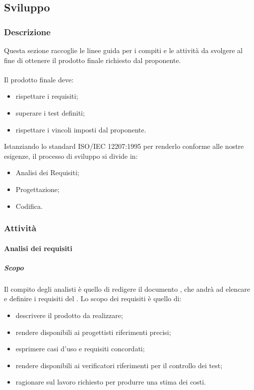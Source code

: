 \subsection{Sviluppo}

	\subsubsection{Descrizione}
	Questa sezione raccoglie le linee guida per i compiti e le attività da svolgere al fine di ottenere il prodotto finale richiesto dal proponente.
    \\\\
	Il prodotto finale deve:
	\begin{itemize}
		\item rispettare i requisiti;
		\item superare i test definiti;
		\item rispettare i vincoli imposti dal proponente.
	\end{itemize}
	Istanziando lo standard ISO/IEC 12207:1995 per renderlo conforme alle nostre esigenze, il processo di sviluppo si divide in:
	\begin{itemize}
		\item Analisi dei Requisiti;
		\item Progettazione;
		\item Codifica.
	\end{itemize}

	\subsubsection{Attività}
        \paragraph{Analisi dei requisiti}
			\subparagraph{Scopo}
			Il compito degli analisti è quello di redigere il documento , che andrà ad elencare e definire i requisiti del . Lo scopo dei requisiti è quello di:
			\begin{itemize}
				\item descrivere il prodotto da realizzare;
				\item rendere disponibili ai progettisti riferimenti precisi;
				\item esprimere casi d'uso e requisiti concordati;
				\item rendere disponibili ai verificatori riferimenti per il controllo dei test;
				\item ragionare sul lavoro richiesto per produrre una stima dei costi.
			\end{itemize}

